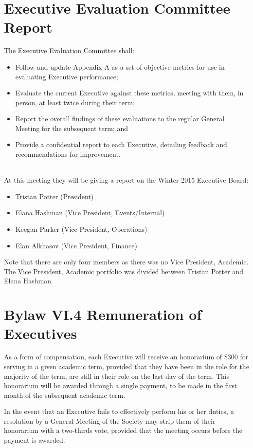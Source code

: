 \documentclass[12pt, letterpaper]{article}
\begin{document}
\newpage
{}
\section*{Executive Evaluation Committee Report}
The Executive Evaluation Committee shall:
\begin{itemize}
	\item Follow and update Appendix A as a set of objective metrics for use in evaluating Executive performance;
	\item Evaluate the current Executive against these metrics, meeting with them, in person, at least twice during their term;
	\item Report the overall findings of these evaluations to the regular General Meeting for the subsequent term;
	and
	\item Provide a confidential report to each Executive, detailing feedback and recommendations for improvement.
\end{itemize}
~\\
At this meeting they will be giving a report on the Winter 2015 Executive Board:
\begin{itemize}
	\item Tristan Potter (President)
	\item Elana Hashman (Vice President, Events/Internal)
	\item Keegan Parker (Vice President, Operations)
	\item Elan Alkhasov (Vice President, Finance)
\end{itemize}

Note that there are only four members as there was no Vice President, Academic. The Vice President, Academic portfolio was divided between Tristan Potter and Elana Hashman. 

\newpage
{}
\section*{Bylaw VI.4 Remuneration of Executives}
As a form of compensation, each Executive will receive an honorarium of \$300 for serving in a given academic term, provided that they have been in the role for the majority of the term, are still in their role on the last day of the term. This honorarium will be awarded through a single payment, to be made in the first month of the subsequent academic term.

In the event that an Executive fails to effectively perform his or her duties, a resolution by a General Meeting of the Society may strip them of their honorarium with a two-thirds vote, provided that the meeting occurs before the payment is awarded.
\end{document}

